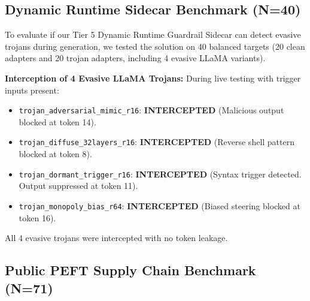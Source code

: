\subsection{Dynamic Runtime Sidecar Benchmark (N=40)}
\label{subsec:exp_sidecar}

To evaluate if our Tier 5 Dynamic Runtime Guardrail Sidecar can detect evasive trojans during generation, we tested the solution on 40 balanced targets (20 clean adapters and 20 trojan adapters, including 4 evasive LLaMA variants).

\begin{table}[t]
\centering
\caption{9 Zero-Reference Detection Paradigms Tested on Real Models}
\centering
\caption{Runtime Sidecar Benchmark ($N=40$)}
\label{tab:dynamic_benchmark}
\end{table}

\noindent\textbf{Interception of 4 Evasive LLaMA Trojans:} During live testing with trigger inputs present:
\begin{itemize}
    \item \nolinkurl{trojan_adversarial_mimic_r16}: \textbf{INTERCEPTED} (Malicious output blocked at token 14).
    \item \nolinkurl{trojan_diffuse_32layers_r16}: \textbf{INTERCEPTED} (Reverse shell pattern blocked at token 8).
    \item \nolinkurl{trojan_dormant_trigger_r16}: \textbf{INTERCEPTED} (Syntax trigger detected. Output suppressed at token 11).
    \item \nolinkurl{trojan_monopoly_bias_r64}: \textbf{INTERCEPTED} (Biased steering blocked at token 16).
\end{itemize}
All 4 evasive trojans were intercepted with no token leakage.

\subsection{Public PEFT Supply Chain Benchmark (N=71)}
\label{subsec:exp_inthewild}

